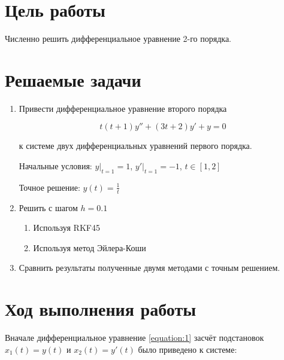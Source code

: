 




\section{Цель работы}
Численно решить дифференциальное уравнение 2-го порядка.

\section{Решаемые задачи}
\begin{enumerate}

\item Привести дифференциальное уравнение второго порядка

\label{equation:1}
\begin{equation}
	t(t+1)y'' + (3t+2)y'  + y = 0
\end{equation}

к системе двух дифференциальных уравнений первого порядка.

	Начальные условия: $\left.y \right|_{t=1} = 1$, $\left.y' \right|_{t=1} = -1$, $t \in[1, 2]$  

    Точное решение: $y(t)=\frac{1}{t}$	

\item Решить с шагом $h = 0.1$

\begin{enumerate}[label=\arabic*)]
\item Используя RKF45
\item Используя метод Эйлера-Коши
\end{enumerate}

\item Сравнить результаты полученные двумя методами с точным решением.

\end{enumerate}

\section{Ход выполнения работы}

Вначале дифференциальное уравнение \ref{equation:1} засчёт подстановок $x_1(t) = y(t)$ и $x_2(t) = y'(t)$ было приведено к системе:


